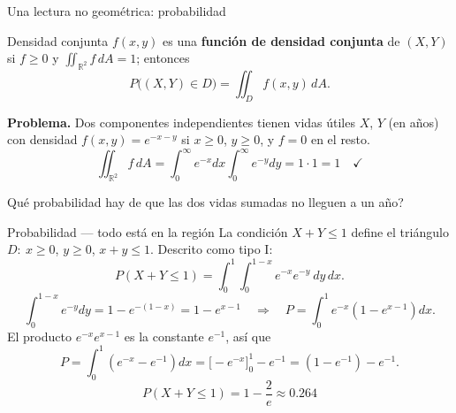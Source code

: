 \documentclass[11pt,aspectratio=169]{beamer}
\begin{document}
\begin{frame}{Una lectura no geométrica: probabilidad}
  \begin{block}{Densidad conjunta}
    $f(x,y)$ es una \textbf{función de densidad conjunta} de $(X,Y)$ si $f\ge0$ y $\iint_{\mathbb R^2}f\,dA=1$; entonces
    \[
      P\bigl((X,Y)\in D\bigr)=\iint_D f(x,y)\,dA.
    \]
  \end{block}
  \pause
  \textbf{Problema.} Dos componentes independientes tienen vidas útiles $X$, $Y$ (en años) con densidad $f(x,y)=e^{-x-y}$ si $x\ge0$, $y\ge0$, y $f=0$ en el resto.
  \pause
  \[
    \iint_{\mathbb R^2}f\,dA=\int_0^\infty\!\! e^{-x}dx\int_0^\infty\!\! e^{-y}dy=1\cdot1=1\quad\checkmark
  \]
  \pause
  \begin{center}\normalsize\color{tealx} \textquestiondown{}Qué probabilidad hay de que las dos vidas sumadas no lleguen a un año?\end{center}
\end{frame}

\begin{frame}{Probabilidad --- todo está en la región}
  La condición $X+Y\le1$ define el triángulo $D:\ x\ge0$, $y\ge0$, $x+y\le1$. Descrito como tipo I:
  \[
    P(X+Y\le1)=\int_0^1\!\!\int_0^{1-x} e^{-x}e^{-y}\ dy\,dx.
  \]
  \pause
  \[
    \int_0^{1-x}\!\! e^{-y}dy = 1-e^{-(1-x)} = 1-e^{x-1}
    \quad\Longrightarrow\quad
    P=\int_0^1 e^{-x}\left(1-e^{x-1}\right)dx.
  \]
  \pause
  El producto $e^{-x}e^{x-1}$ es la constante $e^{-1}$, así que
  \[
    P=\int_0^1\left(e^{-x}-e^{-1}\right)dx
     =\bigl[-e^{-x}\bigr]_0^1-e^{-1}
     =\left(1-e^{-1}\right)-e^{-1}.
  \]
  \pause
  \[
    \boxed{P(X+Y\le1)=1-\frac{2}{e}\approx 0.264}
  \]
\end{frame}

\end{document}
